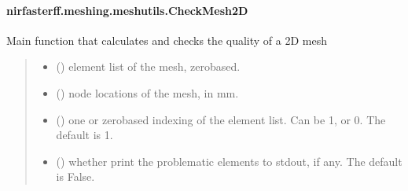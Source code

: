 \documentclass[letterpaper,10pt,english]{sphinxmanual}
\begin{document}
\sphinxstepscope


\paragraph{nirfasterff.meshing.meshutils.CheckMesh2D}
\label{\detokenize{_autosummary/nirfasterff.meshing.meshutils.CheckMesh2D:nirfasterff-meshing-meshutils-checkmesh2d}}\label{\detokenize{_autosummary/nirfasterff.meshing.meshutils.CheckMesh2D::doc}}

\begin{fulllineitems}
\label{\detokenize{_autosummary/nirfasterff.meshing.meshutils.CheckMesh2D:nirfasterff.meshing.meshutils.CheckMesh2D}}
\pysigstartsignatures
{}
\pysigstopsignatures
\sphinxAtStartPar
Main function that calculates and checks the quality of a 2D mesh
\begin{quote}\begin{description}
\begin{itemize}
\item {} 
\sphinxAtStartPar
{} () \textendash{} element list of the mesh, zero\sphinxhyphen{}based.

\item {} 
\sphinxAtStartPar
{} () \textendash{} node locations of the mesh, in mm.

\item {} 
\sphinxAtStartPar
{} (\sphinxstyleliteralemphasis{\sphinxupquote{, }}) \textendash{} one\sphinxhyphen{} or zero\sphinxhyphen{}based indexing of the element list. Can be 1, or 0. The default is 1.

\item {} 
\sphinxAtStartPar
{} (\sphinxstyleliteralemphasis{\sphinxupquote{, }}) \textendash{} whether print the problematic elements to stdout, if any. The default is False.


\end{itemize}
\end{description}
\end{quote}
\end{fulllineitems}
\end{document}
